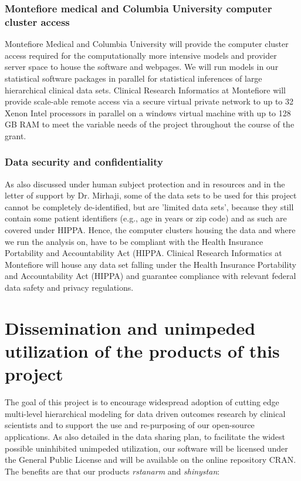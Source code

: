\documentclass[11pt,notitlepage]{article}
\begin{document}
\subsubsection*{Montefiore medical and Columbia University computer cluster access}
Montefiore Medical and Columbia University will provide the computer cluster access required for the computationally more intensive models and provider server space to house the software and webpages. We will run models in our statistical software packages in parallel for statistical inferences of large hierarchical clinical data sets. Clinical Research Informatics at Montefiore will provide scale-able remote access via a secure virtual private network to up to 32 Xenon Intel processors in parallel on a windows virtual machine with up to 128 GB RAM to meet the variable needs of the project throughout the course of the grant. 

\subsubsection*{Data security and confidentiality}
As also discussed under human subject protection and in resources and in the letter of support by Dr. Mirhaji, some of the data sets to be used for this project cannot be completely de-identified, but are 'limited data sets', because they still contain some patient identifiers (e.g., age in years or zip code) and as such are covered under HIPPA. Hence, the computer clusters housing the data and where we run the analysis on, have to be compliant with the Health Insurance Portability and Accountability Act (HIPPA. Clinical Research Informatics at Montefiore will house any data set falling under the Health Insurance Portability and Accountability Act (HIPPA) and guarantee compliance with relevant federal data safety and privacy regulations. 

\section*{Dissemination and unimpeded utilization of the products of this project}
The goal of this project is to encourage widespread adoption of cutting edge 
multi-level hierarchical modeling for data driven outcomes research by 
clinical scientists and to support the use and re-purposing of our 
open-source applications. 
As also detailed in the data sharing plan, to facilitate the widest 
possible uninhibited unimpeded utilization, our software will be 
licensed under the General Public License and will be available on 
the online repository CRAN. The benefits  are that our products 
\textit{rstanarm} and \textit{shinystan}: 
 
\end{document}
